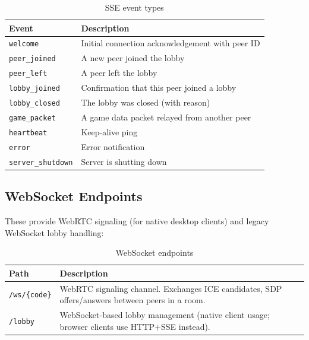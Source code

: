 \begin{table}[htbp]
    \centering
    \caption{SSE event types}
    \begin{tabular}{@{}lp{9cm}@{}}
        \toprule
        \textbf{Event}            & \textbf{Description}                            \\
        \midrule
        \texttt{welcome}          & Initial connection acknowledgement with peer ID \\
        \texttt{peer\_joined}     & A new peer joined the lobby                     \\
        \texttt{peer\_left}       & A peer left the lobby                           \\
        \texttt{lobby\_joined}    & Confirmation that this peer joined a lobby      \\
        \texttt{lobby\_closed}    & The lobby was closed (with reason)              \\
        \texttt{game\_packet}     & A game data packet relayed from another peer    \\
        \texttt{heartbeat}        & Keep-alive ping                                 \\
        \texttt{error}            & Error notification                              \\
        \texttt{server\_shutdown} & Server is shutting down                         \\
        \bottomrule
    \end{tabular}
\end{table}

\subsection{WebSocket Endpoints}
\label{app:c:websocket-endpoints}

These provide WebRTC signaling (for native desktop clients) and legacy WebSocket lobby handling:

\begin{table}[htbp]
    \centering
    \caption{WebSocket endpoints}
    \begin{tabular}{@{}lp{9cm}@{}}
        \toprule
        \textbf{Path}         & \textbf{Description}                                                                            \\
        \midrule
        \texttt{/ws/\{code\}} & WebRTC signaling channel. Exchanges ICE candidates, SDP offers/answers between peers in a room. \\
        \texttt{/lobby}       & WebSocket-based lobby management (native client usage; browser clients use HTTP+SSE instead).   \\
        \bottomrule
    \end{tabular}
\end{table}

